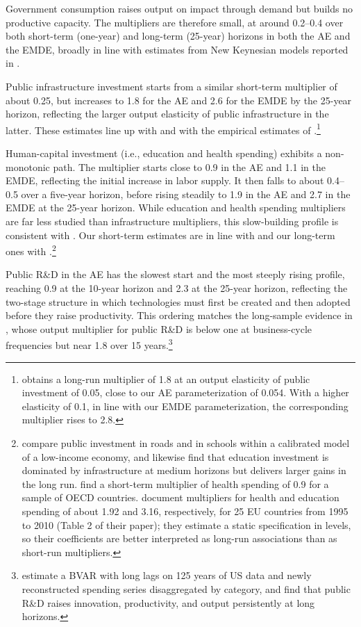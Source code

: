 \documentclass[a4paper,11pt]{article}
\begin{document}
Government consumption raises output on impact through demand but builds no productive capacity.
The multipliers are therefore small, at around 0.2--0.4 over both short-term (one-year) and long-term (25-year) horizons in both the AE and the EMDE, broadly in line with estimates from New Keynesian models reported in \citet{Ramey2020}.

Public infrastructure investment starts from a similar short-term multiplier of about 0.25, but increases to 1.8 for the AE and 2.6 for the EMDE by the 25-year horizon, reflecting the larger output elasticity of public infrastructure in the latter.
These estimates line up with \citet{Ramey2020} and with the empirical estimates of \citet{Abiad2016macroeconomic}.\footnote{\citet{Ramey2020} obtains a long-run multiplier of 1.8 at an output elasticity of public investment of 0.05, close to our AE parameterization of 0.054.
With a higher elasticity of 0.1, in line with our EMDE parameterization, the corresponding multiplier rises to 2.8.}

Human-capital investment (i.e., education and health spending) exhibits a non-monotonic path.
The multiplier starts close to 0.9 in the AE and 1.1 in the EMDE, reflecting the initial increase in labor supply.
It then falls to about 0.4--0.5 over a five-year horizon, before rising steadily to 1.9 in the AE and 2.7 in the EMDE at the 25-year horizon.
While education and health spending multipliers are far less studied than infrastructure multipliers, this slow-building profile is consistent with \citet{Atoliaetal2021}.
Our short-term estimates are in line with \citet{furceri2012effects} and our long-term ones with \citet{reeves2013does}.\footnote{\citet{Atoliaetal2021} compare public investment in roads and in schools within a calibrated model of a low-income economy, and likewise find that education investment is dominated by infrastructure at medium horizons but delivers larger gains in the long run.
\citet{furceri2012effects} find a short-term multiplier of health spending of 0.9 for a sample of OECD countries.
\citet{reeves2013does} document multipliers for health and education spending of about 1.92 and 3.16, respectively, for 25 EU countries from 1995 to 2010 (Table 2 of their paper); they estimate a static specification in levels, so their coefficients are better interpreted as long-run associations than as short-run multipliers.}

Public R\&D in the AE has the slowest start and the most steeply rising profile, reaching 0.9 at the 10-year horizon and 2.3 at the 25-year horizon, reflecting the two-stage structure in which technologies must first be created and then adopted before they raise productivity.
This ordering matches the long-sample evidence in \citet{antolin2025long}, whose output multiplier for public R\&D is below one at business-cycle frequencies but near 1.8 over 15 years.\footnote{\citet{antolin2025long} estimate a BVAR with long lags on 125 years of US data and newly reconstructed spending series disaggregated by category, and find that public R\&D raises innovation, productivity, and output persistently at long horizons.}
\end{document}
